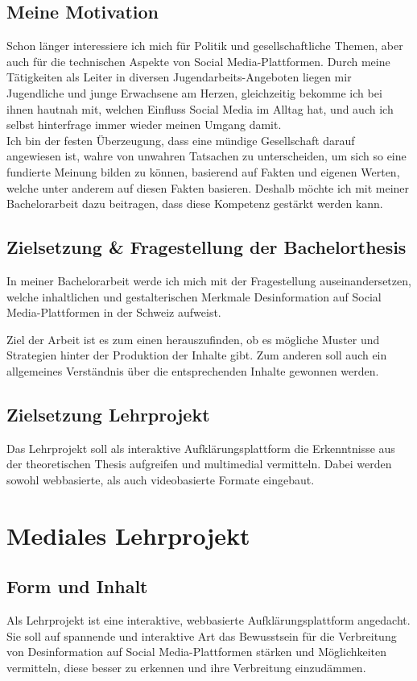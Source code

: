 \documentclass[12pt,a4paper]{article}        %
\begin{document}
\subsection{Meine Motivation}

Schon länger interessiere ich mich für Politik und gesellschaftliche Themen, aber auch für die technischen Aspekte von Social Media-Plattformen. Durch meine Tätigkeiten als Leiter in diversen Jugendarbeits-Angeboten liegen mir Jugendliche und junge Erwachsene am Herzen, gleichzeitig bekomme ich bei ihnen hautnah mit, welchen Einfluss Social Media im Alltag hat, und auch ich selbst hinterfrage immer wieder meinen Umgang damit. \\
Ich bin der festen Überzeugung, dass eine mündige Gesellschaft darauf angewiesen ist, wahre von unwahren Tatsachen zu unterscheiden, um sich so eine fundierte Meinung bilden zu können, basierend auf Fakten und eigenen Werten, welche unter anderem auf diesen Fakten basieren. Deshalb möchte ich mit meiner Bachelorarbeit dazu beitragen, dass diese Kompetenz gestärkt werden kann.

\subsection{Zielsetzung \& Fragestellung der Bachelorthesis}
In meiner Bachelorarbeit werde ich mich mit der Fragestellung auseinandersetzen, welche inhaltlichen und gestalterischen Merkmale Desinformation auf Social Media-Plattformen in der Schweiz aufweist. 

Ziel der Arbeit ist es zum einen herauszufinden, ob es mögliche Muster und Strategien hinter der Produktion der Inhalte gibt. Zum anderen soll auch ein allgemeines Verständnis über die entsprechenden Inhalte gewonnen werden.

\subsection{Zielsetzung Lehrprojekt}
Das Lehrprojekt soll als interaktive Aufklärungsplattform die Erkenntnisse aus der theoretischen Thesis aufgreifen und multimedial vermitteln. Dabei werden sowohl webbasierte, als auch videobasierte Formate eingebaut. \\

\section{Mediales Lehrprojekt}
\subsection{Form und Inhalt}
Als Lehrprojekt ist eine interaktive, webbasierte Aufklärungsplattform angedacht. Sie soll auf spannende und interaktive Art das Bewusstsein für die Verbreitung von Desinformation auf Social Media-Plattformen stärken und Möglichkeiten vermitteln, diese besser zu erkennen und ihre Verbreitung einzudämmen.\\
\end{document}
